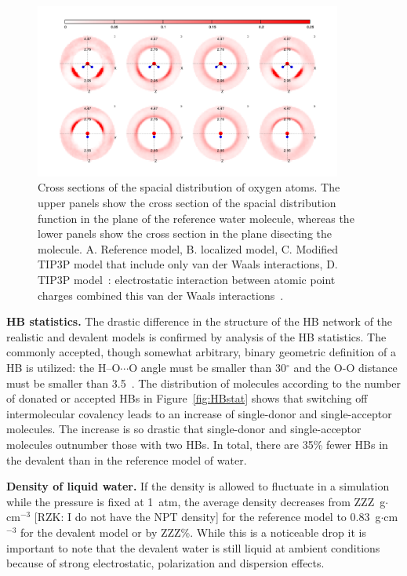 \documentclass[aps,prl,reprint,amsmath,amssymb]{revtex4-1}
\begin{document}
\begin{figure}
\includegraphics[width=0.9\textwidth]{SDF}
\caption{Cross sections of the spacial distribution of oxygen atoms. 
The upper panels show the cross section of the spacial distribution function in the plane of the reference water molecule, whereas the lower panels show the cross section in the plane disecting the molecule. 
A. Reference model, B. localized model, C. Modified TIP3P model that include only van der Waals interactions, D. TIP3P model~\cite{TIP3P}: electrostatic interaction between atomic point charges combined this van der Waals interactions~\cite{TIP3P}.} \label{Fig:SDF}
\end{figure}


\textbf{HB statistics.} The drastic difference in the structure of the HB network of the realistic and devalent models is confirmed by analysis of the HB statistics. 
The commonly accepted, though somewhat arbitrary, binary geometric definition of a HB is utilized: the H--O$\cdots$O angle must be smaller than 30$^{\circ}$ and the O-O distance must be smaller than 3.5\Ang~\cite{RZK-that-justifies-the-use-of-these-cutoofs}. 
The distribution of molecules according to the number of donated or accepted HBs in Figure~\ref{fig:HBstat} shows that switching off intermolecular covalency leads to an increase of single-donor and single-acceptor molecules. 
The increase is so drastic that single-donor and single-acceptor molecules outnumber those with two HBs.
In total, there are 35\% fewer HBs in the devalent than in the reference model of water.

\textbf{Density of liquid water.} If the density is allowed to fluctuate in a simulation while the pressure is fixed at 1~atm, the average density decreases from ZZZ~g$\cdot$cm$^{-3}$ [RZK: I do not have the NPT density] for the reference model to 0.83~g$\cdot$cm$^{-3}$ for the devalent model or by ZZZ\%. 
While this is a noticeable drop it is important to note that the devalent water is still liquid at ambient conditions because of strong electrostatic, polarization and dispersion effects. 
\end{document}
